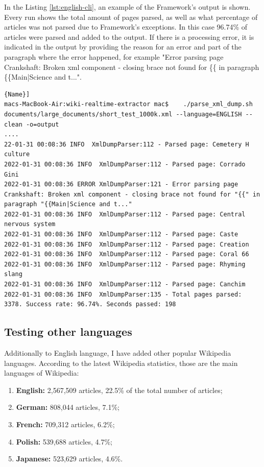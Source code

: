 \documentclass[thesis=M,english,hidelinks]{FITthesis}[2019/12/23]
\begin{document}
In the Listing \ref{lst:english-cli}, an example of the Framework's output is shown. Every run shows the total amount of pages parsed, as well as what percentage of articles was not parsed due to Framework's exceptions. In this case 96.74\% of articles were parsed and added to the output. If there is a processing error, it is indicated in the output by providing the reason for an error and part of the paragraph where the error happened, for example "Error parsing page Crankshaft: Broken xml component - closing brace not found for \{\{ in paragraph \{\{Main|Science and t...".

\begin{lstlisting}[caption=Example of an English processing command,frame=tlrb,  label = {lst:english-cli}]{Name}]
macs-MacBook-Air:wiki-realtime-extractor mac$    ./parse_xml_dump.sh documents/large_documents/short_test_1000k.xml --language=ENGLISH --clean -o=output
....
22-01-31 00:08:36 INFO  XmlDumpParser:112 - Parsed page: Cemetery H culture
2022-01-31 00:08:36 INFO  XmlDumpParser:112 - Parsed page: Corrado Gini
2022-01-31 00:08:36 ERROR XmlDumpParser:121 - Error parsing page Crankshaft: Broken xml component - closing brace not found for "{{" in paragraph "{{Main|Science and t..."
2022-01-31 00:08:36 INFO  XmlDumpParser:112 - Parsed page: Central nervous system
2022-01-31 00:08:36 INFO  XmlDumpParser:112 - Parsed page: Caste
2022-01-31 00:08:36 INFO  XmlDumpParser:112 - Parsed page: Creation
2022-01-31 00:08:36 INFO  XmlDumpParser:112 - Parsed page: Coral 66
2022-01-31 00:08:36 INFO  XmlDumpParser:112 - Parsed page: Rhyming slang
2022-01-31 00:08:36 INFO  XmlDumpParser:112 - Parsed page: Canchim
2022-01-31 00:08:36 INFO  XmlDumpParser:135 - Total pages parsed: 3378. Success rate: 96.74%. Seconds passed: 198
\end{lstlisting}

\subsection{Testing other languages}

Additionally to English language, I have added other popular Wikipedia languages. According to the latest Wikipedia statistics, those are the main languages of Wikipedia\cite{top_ten_wikis}:

\begin{enumerate}
	\item \textbf{English:} 2,567,509 articles, 22.5\% of the total number of articles;
	\item \textbf{German:} 808,044 articles, 7.1\%;
	\item \textbf{French:} 709,312 articles, 6.2\%;
	\item \textbf{Polish:} 539,688 articles, 4.7\%;
	\item \textbf{Japanese:} 523,629 articles, 4.6\%.
\end{enumerate}
\end{document}
